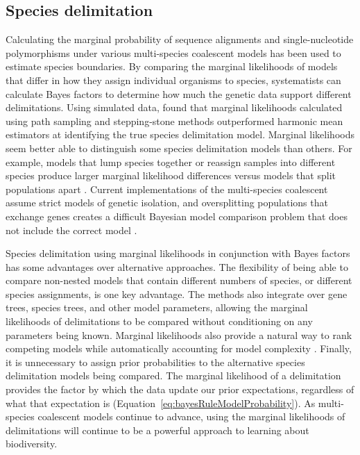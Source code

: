 \subsection{Species delimitation}
Calculating the marginal probability of sequence alignments \citep{Grummer2013}
and single-nucleotide polymorphisms \citep{Leache2014} under various
multi-species coalescent models has been used to estimate species boundaries.
By comparing the marginal likelihoods of models that differ in how they assign
individual organisms to species, systematists can calculate Bayes factors to
determine how much the genetic data support different delimitations.
Using simulated data, \citep{Grummer2013} found that marginal likelihoods
calculated using path sampling and stepping-stone methods outperformed harmonic
mean estimators at identifying the true species delimitation model.
Marginal likelihoods seem better able to distinguish some species delimitation
models than others.
For example, models that lump species together or reassign samples into
different species produce larger marginal likelihood differences versus models
that split populations apart \citep{Grummer2013, Leache2014}.
Current implementations of the multi-species coalescent assume strict models of
genetic isolation, and oversplitting populations that exchange genes creates a
difficult Bayesian model comparison problem that does not include the correct
model
. 

Species delimitation using marginal likelihoods in conjunction with Bayes
factors has some advantages over alternative approaches.
The flexibility of being able to compare non-nested models that contain
different numbers of species, or different species assignments, is one key
advantage.
The methods also integrate over gene trees, species trees, and other model
parameters, allowing the marginal likelihoods of delimitations to be compared
without conditioning on any parameters being known.
Marginal likelihoods also provide a natural way to rank competing models while
automatically accounting for model complexity \citep{Baele2012}.
Finally, it is unnecessary to assign prior probabilities to the alternative
species delimitation models being compared.
The marginal likelihood of a delimitation provides the factor by which the data
update our prior expectations, regardless of what that expectation is
(Equation~\ref{eq:bayesRuleModelProbability}).
As multi-species coalescent models continue to advance, using the marginal
likelihoods of delimitations will continue to be a powerful approach to
learning about biodiversity.


